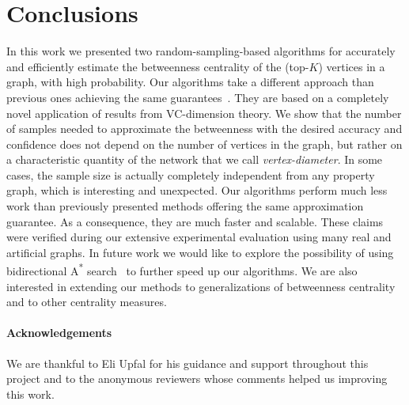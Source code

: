 \section{Conclusions}\label{sec:concl}
In this work we presented two random-sampling-based algorithms for accurately and
efficiently estimate the betweenness centrality of the (top-$K$) vertices in a
graph, with high probability.
Our algorithms take a different approach than previous ones achieving the same
guarantees~\citep{BrandesP07,GeisbergerSS08,JacobKLPT05}. They are based on a
completely novel application of results from VC-dimension theory. We show that
the number of samples needed to approximate the betweenness with the desired
accuracy and confidence does not depend on the number of vertices in the graph,
but rather on a characteristic quantity of the network that we call
\emph{vertex-diameter}. In some cases, the sample size is actually completely
independent from any property graph, which is interesting and unexpected.
Our algorithms perform much less work than previously presented methods offering
the same approximation guarantee. As a consequence, they are much faster and
scalable. These claims were verified during our extensive experimental
evaluation using many real and artificial graphs. In future work we would like
to explore the possibility of using bidirectional A\textsuperscript{*}
search~\citep{Pohl69,KaindlK97} to further speed up our algorithms.  We are also
interested in extending our methods to generalizations of betweenness
centrality~\citep{KourtellisASIT12,DolevEP10} and to other centrality measures. 

\paragraph*{Acknowledgements} We are thankful to Eli Upfal for his guidance and
support throughout this project and to the anonymous reviewers whose comments
helped us improving this work.


